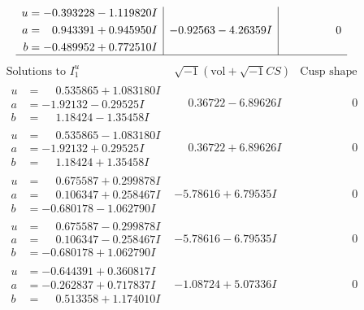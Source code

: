 \documentclass[1p]{elsarticle_modified}
\theoremstyle{definition}
\newcommand{\I}{\sqrt{-1}}
\begin{document}
$$\begin{array}{c|c|c}
\begin{aligned}
u &= -0.393228 - 1.119820 I \\
a &= \phantom{-}0.943391 + 0.945950 I \\
b &= -0.489952 + 0.772510 I\end{aligned}
 & -0.92563 - 4.26359 I & \phantom{-0.000000 } 0\\
 \hline 
 \end{array}$$\newpage$$\begin{array}{c|c|c}  
\text{Solutions to }I^u_{1}& \I (\text{vol} + \sqrt{-1}CS) & \text{Cusp shape}\\
 \hline 
\begin{aligned}
u &= \phantom{-}0.535865 + 1.083180 I \\
a &= -1.92132 - 0.29525 I \\
b &= \phantom{-}1.18424 - 1.35458 I\end{aligned}
 & \phantom{-}0.36722 - 6.89626 I & \phantom{-0.000000 } 0 \\ \hline\begin{aligned}
u &= \phantom{-}0.535865 - 1.083180 I \\
a &= -1.92132 + 0.29525 I \\
b &= \phantom{-}1.18424 + 1.35458 I\end{aligned}
 & \phantom{-}0.36722 + 6.89626 I & \phantom{-0.000000 } 0 \\ \hline\begin{aligned}
u &= \phantom{-}0.675587 + 0.299878 I \\
a &= \phantom{-}0.106347 + 0.258467 I \\
b &= -0.680178 - 1.062790 I\end{aligned}
 & -5.78616 + 6.79535 I & \phantom{-0.000000 } 0 \\ \hline\begin{aligned}
u &= \phantom{-}0.675587 - 0.299878 I \\
a &= \phantom{-}0.106347 - 0.258467 I \\
b &= -0.680178 + 1.062790 I\end{aligned}
 & -5.78616 - 6.79535 I & \phantom{-0.000000 } 0 \\ \hline\begin{aligned}
u &= -0.644391 + 0.360817 I \\
a &= -0.262837 + 0.717837 I \\
b &= \phantom{-}0.513358 + 1.174010 I\end{aligned}
 & -1.08724 + 5.07336 I & \phantom{-0.000000 } 0 \\ \hline\begin{aligned}

\end{aligned}
\end{array}$$
\end{document}
